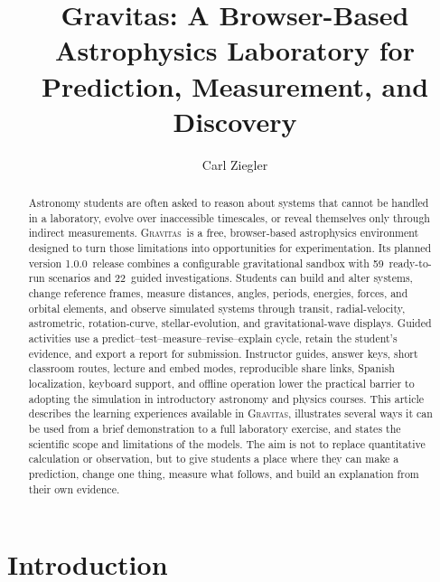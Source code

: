 \documentclass[twocolumn]{aastex631}
\newcommand{\Gravitas}{\textsc{Gravitas}}
\newcommand{\Version}{1.0.0}
\newcommand{\ScenarioCount}{59}
\newcommand{\InvestigationCount}{22}
\begin{document}
\title{Gravitas: A Browser-Based Astrophysics Laboratory for Prediction,
Measurement, and Discovery}

\author{Carl Ziegler}


\begin{abstract}
Astronomy students are often asked to reason about systems that cannot be
handled in a laboratory, evolve over inaccessible timescales, or reveal
themselves only through indirect measurements. \Gravitas\ is a free,
browser-based astrophysics environment designed to turn those limitations into
opportunities for experimentation. Its planned version \Version\ release
combines a configurable gravitational sandbox with \ScenarioCount\ ready-to-run
scenarios and \InvestigationCount\ guided investigations. Students can build and
alter systems, change reference frames, measure distances, angles, periods,
energies, forces, and orbital elements, and observe simulated systems through
transit, radial-velocity, astrometric, rotation-curve, stellar-evolution, and
gravitational-wave displays. Guided activities use a
predict--test--measure--revise--explain cycle, retain the student's evidence, and
export a report for submission. Instructor guides, answer keys, short classroom
routes, lecture and embed modes, reproducible share links, Spanish localization,
keyboard support, and offline operation lower the practical barrier to adopting
the simulation in introductory astronomy and physics courses. This article
describes the learning experiences available in \Gravitas, illustrates several
ways it can be used from a brief demonstration to a full laboratory exercise,
and states the scientific scope and limitations of the models. The aim is not to
replace quantitative calculation or observation, but to give students a place
where they can make a prediction, change one thing, measure what follows, and
build an explanation from their own evidence.
\end{abstract}


\section{Introduction}
\label{sec:introduction}
\end{document}
